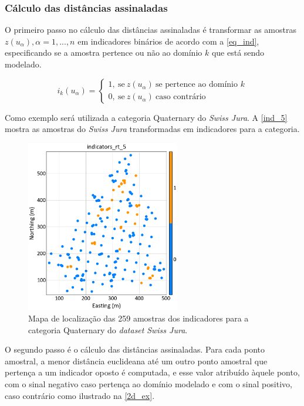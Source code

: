 \subsubsection{Cálculo das distâncias assinaladas}

O primeiro passo no cálculo das distâncias assinaladas é transformar as amostras ${z(u_\alpha),\alpha=1,...,n}$ em indicadores binários de acordo com a \autoref{eq_ind}, especificando se a amostra pertence ou não ao domínio $k$ que está sendo modelado.

\begin{equation}
	i_k(u_\alpha)=\begin{cases}
	1,\:\textrm{se}\:z(u_\alpha)\:\textrm{se pertence ao domínio $k$}\\
	0,\:\textrm{se}\:z(u_\alpha)\:\textrm{caso contrário}\end{cases}
    \label{eq_ind}
\end{equation}

Como exemplo será utilizada a categoria Quaternary do \textit{Swiss Jura}. A \autoref{ind_5} mostra as amostras do \textit{Swiss Jura} transformadas em indicadores para a categoria.

\begin{figure}[H]
	\centering
	\caption{\label{ind_5}Mapa de localização das 259 amostras dos indicadores para a categoria Quaternary do \textit{dataset} \textit{Swiss Jura}.}
	\includegraphics[width=0.6\textwidth]{capitulo_2/imagens/ind5.png}
\end{figure}

O segundo passo é o cálculo das distâncias assinaladas. Para cada ponto amostral, a menor distância euclideana até um outro ponto amostral que pertença a um indicador oposto é computada, e esse valor atribuído àquele ponto, com o sinal negativo caso pertença ao domínio modelado e com o sinal positivo, caso contrário como ilustrado na \autoref{2d_ex}. 

